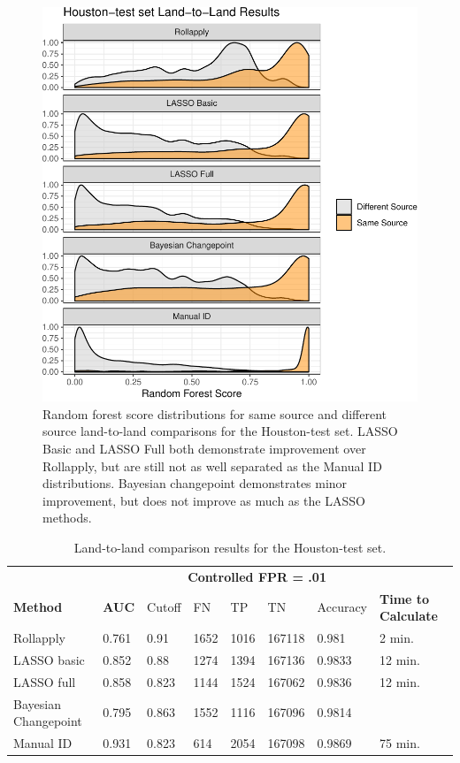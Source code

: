 \documentclass[12pt]{article}
\begin{document}
\begin{figure}
\centering
\includegraphics{writeup_files/figure-latex/houston-groove-results-1.pdf}
\caption{\label{houston-groove-results}Random forest score distributions
for same source and different source land-to-land comparisons for the
Houston-test set. LASSO Basic and LASSO Full both demonstrate
improvement over Rollapply, but are still not as well separated as the
Manual ID distributions. Bayesian changepoint demonstrates minor
improvement, but does not improve as much as the LASSO methods.}
\end{figure}

\begin{table}[]
\centering
\begin{tabular}{llllllll}
& & \multicolumn{5}{c}{\textbf{Controlled FPR = .01}} & \\
\textbf{Method} & \textbf{AUC} & Cutoff & FN &TP & TN & Accuracy & \textbf{Time to Calculate} \\ \hline
Rollapply & 0.761 &  0.91 & 1652 & 1016&167118 & 0.981 & 2 min. \\ \hline
LASSO basic & 0.852 &  0.88 &1274 & 1394&167136 & 0.9833 & 12 min. \\ \hline
LASSO full & 0.858 &  0.823 &1144 &1524 &167062 & 0.9836 & 12 min. \\ \hline
Bayesian Changepoint & 0.795 &  0.863 &1552 & 1116&167096 & 0.9814 & \\ \hline
Manual ID & 0.931 &  0.823 & 614& 2054&167098 & 0.9869 & 75 min. \\ \hline 
\end{tabular}
\caption{Land-to-land comparison results for the Houston-test set.}
\label{houston-table}
\end{table}
\end{document}
